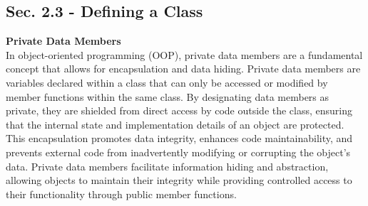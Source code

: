 \subsection*{Sec. 2.3 - Defining a Class}
\noindent \textbf{Private Data Members} \\

In object-oriented programming (OOP), private data members are a fundamental concept that allows for encapsulation and data hiding. Private data members are variables declared within a class that can only be accessed or modified by member functions within the same class. 
By designating data members as private, they are shielded from direct access by code outside the class, ensuring that the internal state and implementation details of an object are protected. This encapsulation promotes data integrity, enhances code maintainability, and 
prevents external code from inadvertently modifying or corrupting the object's data. Private data members facilitate information hiding and abstraction, allowing objects to maintain their integrity while providing controlled access to their functionality through public 
member functions. \\

